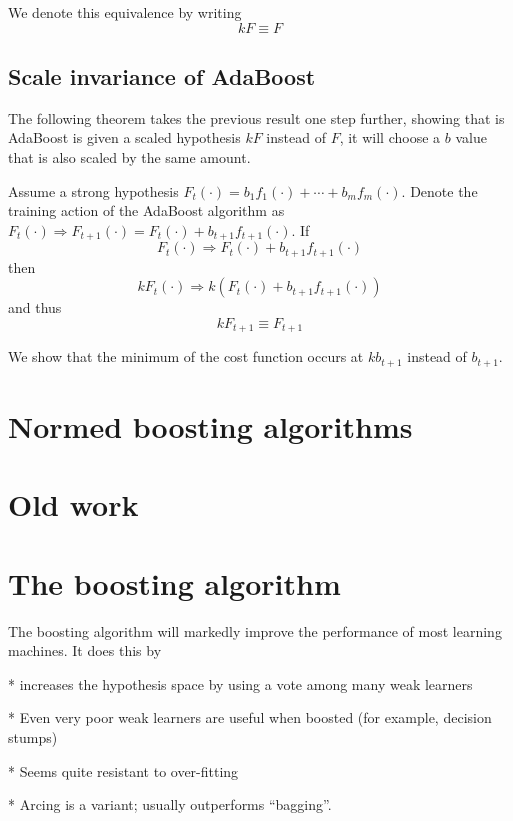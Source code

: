 We denote this equivalence by writing
\[
kF \equiv F
\]


\subsection{Scale invariance of AdaBoost}

The following theorem takes the previous result one step further,
showing that is AdaBoost is given a scaled hypothesis $kF$ instead of
$F$, it will choose a $b$ value that is also scaled by the same
amount.

\begin{theorem}
Assume a strong hypothesis $F_t(\cdot) = b_1 f_1(\cdot) + \cdots + b_m
f_m(\cdot)$.  Denote the training action of the AdaBoost algorithm as
$F_t(\cdot) \Rightarrow F_{t+1}(\cdot) = F_t(\cdot) +
b_{t+1}f_{t+1}(\cdot)$.  If
\[
	F_t(\cdot) \Rightarrow F_t(\cdot) + b_{t+1}f_{t+1}(\cdot)
\]
then
\[
	kF_t(\cdot) \Rightarrow k\left( F_t(\cdot) +
	b_{t+1}f_{t+1}(\cdot) \right)
\]
and thus
\[
	kF_{t+1} \equiv F_{t+1}
\]

\proof We show that the minimum of the cost function occurs at
$kb_{t+1}$ instead of $b_{t+1}$.
\end{theorem}



\section{Normed boosting algorithms}



\section{Old work}


\section{The boosting algorithm}

The boosting algorithm will markedly improve the performance of most
learning machines.  It does this by 

* increases the hypothesis space by using a vote among many weak
  learners

* Even very poor weak learners are useful when boosted (for example,
  decision stumps)

* Seems quite resistant to over-fitting

* Arcing is a variant; usually outperforms ``bagging''.

